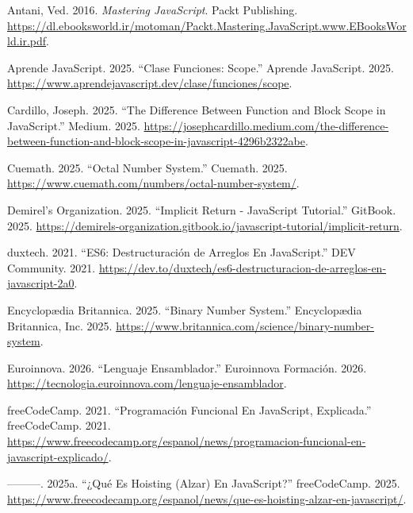 \documentclass[
  letterpaper,
  DIV=11,
  numbers=noendperiod]{scrreprt}
\newlength{\cslhangindent}
\newenvironment{CSLReferences}[2] %
 {\begin{list}{}{%
  \setlength{\itemindent}{0pt}
  \setlength{\leftmargin}{0pt}
  \setlength{\parsep}{0pt}
  \ifodd #1
   \setlength{\leftmargin}{\cslhangindent}
   \setlength{\itemindent}{-1\cslhangindent}
  \fi
  \setlength{\itemsep}{#2\baselineskip}}}
 {\end{list}}
\begin{document}
\label{refs}
\begin{CSLReferences}{1}{0}
Antani, Ved. 2016. \emph{Mastering JavaScript}. Packt Publishing.
\url{https://dl.ebooksworld.ir/motoman/Packt.Mastering.JavaScript.www.EBooksWorld.ir.pdf}.

Aprende JavaScript. 2025. {``Clase Funciones: Scope.''} Aprende
JavaScript. 2025.
\url{https://www.aprendejavascript.dev/clase/funciones/scope}.

Cardillo, Joseph. 2025. {``The Difference Between Function and Block
Scope in JavaScript.''} Medium. 2025.
\url{https://josephcardillo.medium.com/the-difference-between-function-and-block-scope-in-javascript-4296b2322abe}.

Cuemath. 2025. {``Octal Number System.''} Cuemath. 2025.
\url{https://www.cuemath.com/numbers/octal-number-system/}.

Demirel's Organization. 2025. {``Implicit Return - JavaScript
Tutorial.''} GitBook. 2025.
\url{https://demirels-organization.gitbook.io/javascript-tutorial/implicit-return}.

duxtech. 2021. {``ES6: Destructuración de Arreglos En JavaScript.''} DEV
Community. 2021.
\url{https://dev.to/duxtech/es6-destructuracion-de-arreglos-en-javascript-2a0}.

Encyclopædia Britannica. 2025. {``Binary Number System.''} Encyclopædia
Britannica, Inc. 2025.
\url{https://www.britannica.com/science/binary-number-system}.

Euroinnova. 2026. {``Lenguaje Ensamblador.''} Euroinnova Formación.
2026. \url{https://tecnologia.euroinnova.com/lenguaje-ensamblador}.

freeCodeCamp. 2021. {``Programación Funcional En JavaScript,
Explicada.''} freeCodeCamp. 2021.
\url{https://www.freecodecamp.org/espanol/news/programacion-funcional-en-javascript-explicado/}.

---------. 2025a. {``¿Qué Es Hoisting (Alzar) En JavaScript?''}
freeCodeCamp. 2025.
\url{https://www.freecodecamp.org/espanol/news/que-es-hoisting-alzar-en-javascript/}.


\end{CSLReferences}
\end{document}
